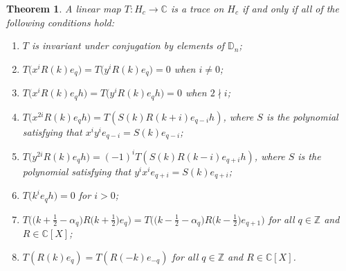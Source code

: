 \documentclass[pdftex]{sigma}
\newcommand\numbers{\textup{(\arabic*)}}
\newcommand\ZZ{\mathbb{Z}}
\newcommand\CC{\mathbb{C}}
\newcommand\DD{\mathbb{D}}
\newcommand\half{\ensuremath{\frac{1}{2}}}
\numberwithin{equation}{section}
\newtheorem{Theorem}{Theorem}[section]
\theoremstyle{definition}
\begin{document}
\begin{Theorem}
 \label{thm:classif}
 A linear map $T\colon H_c \to \CC$
 is a trace on $H_c$ if and only if
 all of the following conditions hold:
 \begin{enumerate}[label=\numbers]\itemsep=0pt
 \item $T$ is invariant under conjugation
 by elements of $\DD_n$;
 \label{cond:inv}
 \item $T\bigl(x^i R(k) e_q\bigr) = T\bigl(y^i R(k) e_q\bigr) = 0$
 when $i \neq 0$;
 \label{cond:g0}
 \item $T\bigl(x^i R(k) e_q h\bigr) = T\bigl(y^i R(k) e_q h\bigr) = 0$
 when $2 \nmid i$;
 \label{cond:h0}
 \item $T\bigl(x^{2i} R(k) e_q h\bigr) = T(S(k) R(k + i) e_{q - i} h)$,
 where $S$ is the polynomial
 satisfying that $x^i y^i e_{q - i}\allowbreak = S(k) e_{q - i}$;
 \label{cond:h_av}
 \item $T\bigl(y^{2i} R(k) e_q h\bigr) = (-1)^i T(S(k) R(k - i) e_{q + i} h)$,
 where $S$ is the polynomial
 satisfying that $y^i x^i e_{q + i} = S(k) e_{q + i}$;
 \label{cond:h_av_flip}
 \item $T\bigl(k^i e_q h\bigr) = 0$ for $i > 0$;
 \label{cond:k_poly}
 \item $T\bigl( \bigl(k + \half - \alpha_q\bigr) R\bigl(k + \half\bigr) e_q\bigr) =
 T\bigl( \bigl(k - \half - \alpha_q\bigr) R\bigl(k - \half\bigr) e_{q + 1}\bigr)$
 for all $q \in \ZZ$ and $R \in \CC[X]$;
 \label{cond:shift}
 \item $T( R(k) e_q ) = T( R(-k) e_{-q} )$
 for all $q \in \ZZ$ and $R \in \CC[X]$.
 \label{cond:even}
 \end{enumerate}
\end{Theorem}
\end{document}
